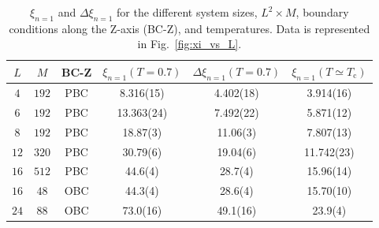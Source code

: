 \begin{table}[b]
    \centering
    \begin{ruledtabular}
    \begin{tabular}{cccccc}
        $L$ & $M$ & BC-Z & $\xi_{n=1}(T=0.7)$ & $\Delta\xi_{n=1}(T=0.7)$ & $\xi_{n=1}(T\simeq T_\mathrm{c})$ \\\hline
         $4$ & $192$ & PBC & 8.316(15) & 4.402(18) & 3.914(16)\\
         $6$ & $192$ & PBC & 13.363(24) & 7.492(22) & 5.871(12)\\
         $8$ & $192$ & PBC & 18.87(3) & 11.06(3) & 7.807(13)\\
         $12$ & $320$ & PBC & 30.79(6) & 19.04(6) & 11.742(23)\\
         $16$ & $512$ & PBC & 44.6(4) & 28.7(4) & 15.96(14)\\
         $16$ & $48$ & OBC & 44.3(4) & 28.6(4) & 15.70(10)\\
         $24$ & $88$ & OBC & 73.0(16) & 49.1(16) & 23.9(4)\\
   \end{tabular}
    \end{ruledtabular}
    \caption{$\xi_{n=1}$ and $\Delta\xi_{n=1}$ for the different system sizes, $L^2\times M$, boundary conditions along the Z-axis (BC-Z), and temperatures. Data is represented in Fig.~\ref{fig:xi_vs_L}.}
    \label{tab:xi}
\end{table}
